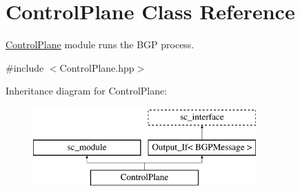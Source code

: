 \hypertarget{classControlPlane}{\section{Control\-Plane Class Reference}
\label{classControlPlane}
}


\hyperlink{classControlPlane}{Control\-Plane} module runs the B\-G\-P process.  




{\ttfamily \#include $<$Control\-Plane.\-hpp$>$}

Inheritance diagram for Control\-Plane\-:\begin{figure}[H]
\begin{center}
\leavevmode
\includegraphics[height=3.000000cm]{classControlPlane}
\end{center}
\end{figure}
